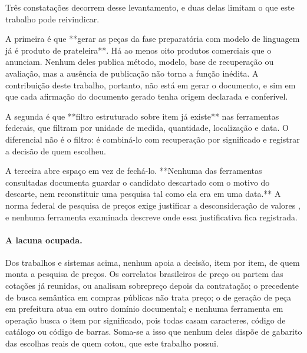 Três constatações decorrem desse levantamento, e duas delas limitam o que este
trabalho pode reivindicar.

A primeira é que **gerar as peças da fase preparatória com modelo de linguagem
já é produto de prateleira**. Há ao menos oito produtos comerciais que o
anunciam. Nenhum deles publica método, modelo, base de recuperação ou avaliação,
mas a ausência de publicação não torna a função inédita. A contribuição deste
trabalho, portanto, não está em gerar o documento, e sim em que cada afirmação
do documento gerado tenha origem declarada e conferível.

A segunda é que **filtro estruturado sobre item já existe** nas ferramentas
federais, que filtram por unidade de medida, quantidade, localização e data. O
diferencial não é o filtro: é combiná-lo com recuperação por significado e
registrar a decisão de quem escolheu.

A terceira abre espaço em vez de fechá-lo. **Nenhuma das ferramentas consultadas
documenta guardar o candidato descartado com o motivo do descarte, nem
reconstituir uma pesquisa tal como ela era em uma data.** A norma federal de
pesquisa de preços exige justificar a desconsideração de valores
\cite{brasil2021in65}, e nenhuma ferramenta examinada descreve onde essa
justificativa fica registrada.

\paragraph{A lacuna ocupada.} Dos trabalhos e sistemas acima, nenhum apoia a
decisão, item por item, de quem monta a pesquisa de preços. Os correlatos
brasileiros de preço ou partem das cotações já reunidas, ou analisam sobrepreço
depois da contratação; o precedente de busca semântica em compras públicas não
trata preço; o de geração de peça em prefeitura atua em outro domínio
documental; e nenhuma ferramenta em operação busca o item por significado, pois
todas casam caracteres, código de catálogo ou código de barras. Soma-se a isso
que nenhum deles dispõe de gabarito das escolhas reais de quem cotou, que este
trabalho possui.

